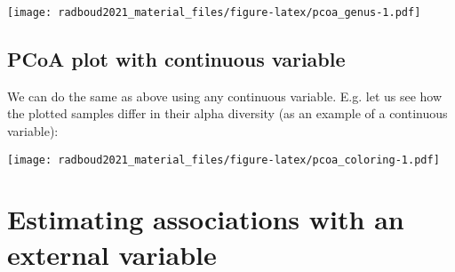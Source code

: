 \documentclass[
]{book}
\newenvironment{Shaded}{\begin{snugshade}}{\end{snugshade}}
\newcommand{\AttributeTok}[1]{\textcolor[rgb]{0.77,0.63,0.00}{#1}}
\newcommand{\CommentTok}[1]{\textcolor[rgb]{0.56,0.35,0.01}{\textit{#1}}}
\newcommand{\DecValTok}[1]{\textcolor[rgb]{0.00,0.00,0.81}{#1}}
\newcommand{\FunctionTok}[1]{\textcolor[rgb]{0.00,0.00,0.00}{#1}}
\newcommand{\NormalTok}[1]{#1}
\newcommand{\OtherTok}[1]{\textcolor[rgb]{0.56,0.35,0.01}{#1}}
\newcommand{\SpecialCharTok}[1]{\textcolor[rgb]{0.00,0.00,0.00}{#1}}
\newcommand{\StringTok}[1]{\textcolor[rgb]{0.31,0.60,0.02}{#1}}
\begin{document}
\texttt{[image: radboud2021\_material\_files/figure-latex/pcoa\_genus-1.pdf]}

\hypertarget{pcoa-plot-with-continuous-variable}{%
\subsection{PCoA plot with continuous variable}\label{pcoa-plot-with-continuous-variable}}

We can do the same as above using any continuous variable. E.g. let us
see how the plotted samples differ in their alpha diversity (as an
example of a continuous variable):

\begin{Shaded}
\end{Shaded}

\texttt{[image: radboud2021\_material\_files/figure-latex/pcoa\_coloring-1.pdf]}

\hypertarget{estimating-associations-with-an-external-variable}{%
\section{Estimating associations with an external variable}\label{estimating-associations-with-an-external-variable}}
\end{document}

